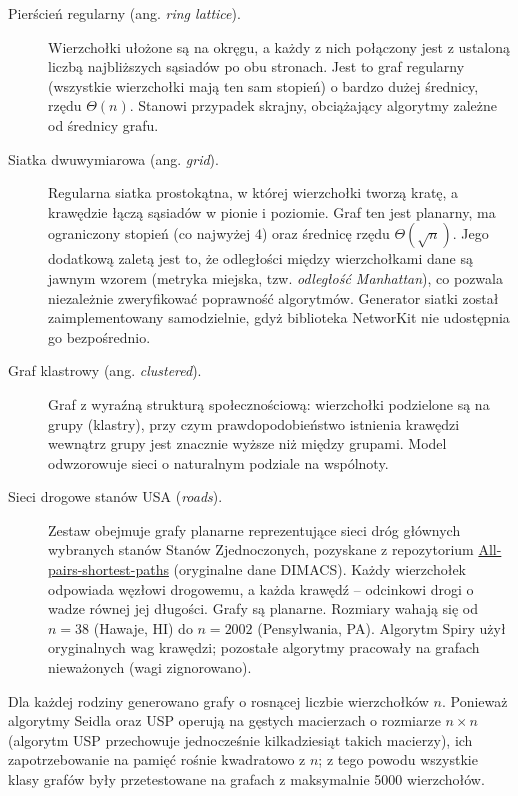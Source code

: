 \begin{description}
    \item[Pierścień regularny (ang. \emph{ring lattice}).] Wierzchołki ułożone są
        na okręgu, a każdy z nich połączony jest z ustaloną liczbą najbliższych
        sąsiadów po obu stronach. Jest to graf regularny (wszystkie wierzchołki
        mają ten sam stopień) o bardzo dużej średnicy, rzędu $\Theta(n)$.
        Stanowi przypadek skrajny, obciążający algorytmy zależne od średnicy grafu.

    \item[Siatka dwuwymiarowa (ang. \emph{grid}).] Regularna siatka prostokątna,
        w której wierzchołki tworzą kratę, a krawędzie łączą sąsiadów w pionie
        i poziomie. Graf ten jest planarny, ma ograniczony stopień (co najwyżej $4$)
        oraz średnicę rzędu $\Theta(\sqrt{n})$. Jego dodatkową zaletą jest to, że
        odległości między wierzchołkami dane są jawnym wzorem (metryka miejska,
        tzw. \emph{odległość Manhattan}), co pozwala niezależnie zweryfikować
        poprawność algorytmów. Generator siatki został zaimplementowany samodzielnie,
        gdyż biblioteka NetworKit nie udostępnia go bezpośrednio.

    \item[Graf klastrowy (ang. \emph{clustered}).] Graf z wyraźną strukturą
        społecznościową: wierzchołki podzielone są na grupy (klastry), przy czym
        prawdopodobieństwo istnienia krawędzi wewnątrz grupy jest znacznie wyższe
        niż między grupami. Model odwzorowuje sieci o naturalnym podziale na
        wspólnoty.

    \item[Sieci drogowe stanów USA (\emph{roads}).]
    Zestaw obejmuje grafy planarne reprezentujące sieci dróg głównych
    wybranych stanów Stanów Zjednoczonych, pozyskane z repozytorium
    \href{https://github.com/Antoine-H/All-pairs-shortest-paths}{All-pairs-shortest-paths} (oryginalne
    dane DIMACS). Każdy wierzchołek odpowiada węzłowi drogowemu, a każda
    krawędź -- odcinkowi drogi o wadze równej jej długości.
    Grafy są planarne. Rozmiary wahają się od $n = 38$ (Hawaje, HI) do $n = 2002$
    (Pensylwania, PA). Algorytm Spiry użył oryginalnych wag krawędzi;
    pozostałe algorytmy pracowały na grafach nieważonych (wagi zignorowano).
\end{description}

Dla każdej rodziny generowano grafy o rosnącej liczbie wierzchołków $n$.
Ponieważ algorytmy Seidla oraz USP operują na gęstych macierzach o rozmiarze
$n \times n$ (algorytm USP przechowuje jednocześnie kilkadziesiąt takich macierzy),
ich zapotrzebowanie na pamięć rośnie kwadratowo z $n$; z tego powodu wszystkie klasy grafów były przetestowane na grafach z maksymalnie 5000 wierzchołów.

